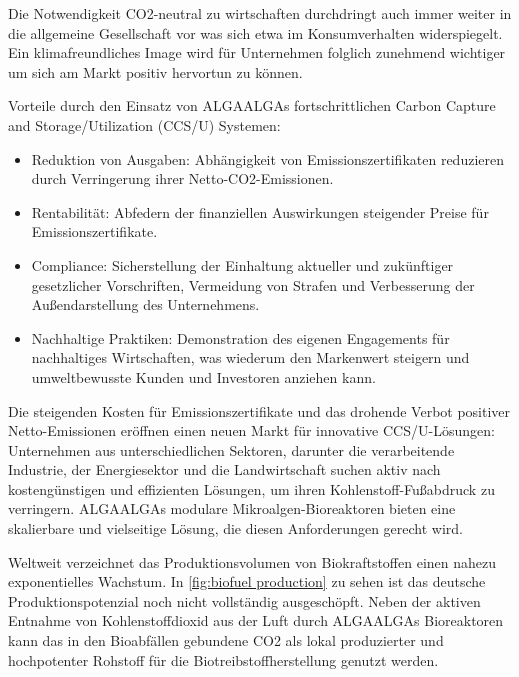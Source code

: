 Die Notwendigkeit CO2-neutral zu wirtschaften durchdringt auch immer weiter in die allgemeine Gesellschaft vor was sich etwa im Konsumverhalten widerspiegelt.
Ein klimafreundliches Image wird für Unternehmen folglich zunehmend wichtiger um sich am Markt positiv hervortun zu können.\par\medskip

Vorteile durch den Einsatz von ALGAALGAs fortschrittlichen Carbon Capture and Storage/Utilization (CCS/U) Systemen:

\begin{itemize}
    \item Reduktion von Ausgaben: Abhängigkeit von Emissionszertifikaten reduzieren durch Verringerung ihrer Netto-CO2-Emissionen.
    \item Rentabilität: Abfedern der finanziellen Auswirkungen steigender Preise für Emissionszertifikate.
    \item Compliance: Sicherstellung der Einhaltung aktueller und zukünftiger gesetzlicher Vorschriften, Vermeidung von Strafen und Verbesserung der Außendarstellung des Unternehmens.
    \item Nachhaltige Praktiken: Demonstration des eigenen Engagements für nachhaltiges Wirtschaften, was wiederum den Markenwert steigern und umweltbewusste Kunden und Investoren anziehen kann.
\end{itemize}

Die steigenden Kosten für Emissionszertifikate und das drohende Verbot positiver Netto-Emissionen eröffnen einen neuen Markt für innovative CCS/U-Lösungen: Unternehmen aus unterschiedlichen Sektoren, darunter die verarbeitende Industrie, der Energiesektor und die Landwirtschaft suchen aktiv nach kostengünstigen und effizienten Lösungen, um ihren Kohlenstoff-Fußabdruck zu verringern.
ALGAALGAs modulare Mikroalgen-Bioreaktoren bieten eine skalierbare und vielseitige Lösung, die diesen Anforderungen gerecht wird.\par\medskip

Weltweit verzeichnet das Produktionsvolumen von Biokraftstoffen einen nahezu exponentielles Wachstum.
In \cref{fig:biofuel production} zu sehen ist das deutsche Produktionspotenzial noch nicht vollständig ausgeschöpft. 
Neben der aktiven Entnahme von Kohlenstoffdioxid aus der Luft durch ALGAALGAs Bioreaktoren kann das in den Bioabfällen gebundene CO2 als lokal produzierter und hochpotenter Rohstoff für die Biotreibstoffherstellung genutzt werden.

